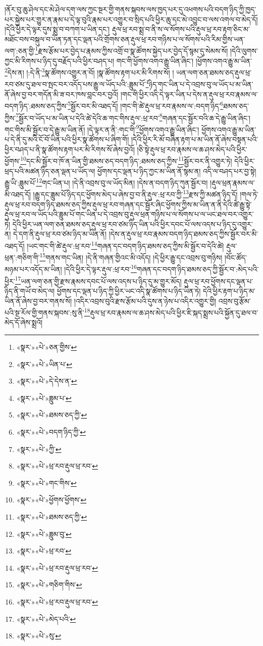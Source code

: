 །ནོར་བུ་ཆུ་ཤེལ་དང་མེ་ཤེལ་དག་ལས་ཀྱང་སྔར་གྱི་གནས་སྐབས་ལས་ཁྱད་པར་དུ་འཕགས་པའི་བདག་ཉིད་ཀྱི་ཁྱད་པར་སྐྱེས་པར་གྱུར་ན་རྣམ་པ་དེ་ལྟ་བུའི་རྣམ་པར་འགྱུར་བ་སྲིད་པའི་ཕྱིར་ཆུ་དང་མེ་འབྱུང་བ་ལས་འགལ་བ་མེད་དོ། །དེའི་ཕྱིར་དེ་ལྟར་དུས་སྨྲ་བ་བཀག་པ་ཡིན་དང་། རྡུལ་ཕྲ་རབ་སྨྲ་བ་ནི་ས་ལ་སོགས་པའི་རྡུལ་ཕྲ་རབ་རྟག་ཅིང་མ་མཐོང་བས་བསྐུལ་བ་ཡོན་ཏན་དང་ལྡན་པའི་གྲོགས་ཅན་རྡུལ་ཕྲ་རབ་གཉིས་པ་ལ་སོགས་པའི་རིམ་གྱིས་ཡན་ལག་:ཅན་གྱི་\footnote{«སྣར་»«པེ་»ཅན་གྱིས་}རྫས་རྩོམ་པར་བྱེད་པ་རྣམས་ཀྱིས་འགྲོ་བ་སྣ་ཚོགས་སྐྱེད་པར་བྱེད་དོ་སྙམ་དུ་སེམས་སོ། །དེའི་ལུགས་ཀྱང་མི་རིགས་པ་ཉིད་དུ་བརྗོད་པའི་ཕྱིར་བཤད་པ། གང་གི་ཕྱོགས་འགའ་རྒྱུ་ཡིན་ཞིང་། །ཕྱོགས་འགའ་རྒྱུ་མ་ཡིན་\footnote{«སྣར་»«པེ་»ཡིན་པ་}དེས་ན། །:དེ་ནི་\footnote{«སྣར་»«པེ་»དེ་དེས་ན་}སྣ་ཚོགས་འགྱུར་ན་བོ། །སྣ་ཚོགས་རྟག་པར་མི་རིགས་སོ། །
ཡན་ལག་ཅན་ཐམས་ཅད་རྡུལ་ཕྲ་རབ་ཙམ་དུ་ཐལ་བ་སྤང་བར་འདོད་པས་རྒྱུ་ལ་ཡོད་པའི་:ཟླུམ་པོ་\footnote{«སྣར་»«པེ་»ཟླུམ་པ་}ཉིད་གང་ཡིན་པ་དེ་འབྲས་བུ་ལ་ཡོད་པ་མ་ཡིན་ནོ་ཞེས་བྱ་བར་གདོན་མི་ཟ་བར་ཁས་བླང་བར་བྱའོ། །གང་གི་ཕྱིར་འདི་དེ་ལྟར་ཡིན་པ་དེས་ན་རྡུལ་ཕྲ་རབ་རྣམས་ལ་བདག་ཉིད་:ཐམས་ཅད་ཀྱིས་\footnote{«སྣར་»«པེ་»ཐམས་ཅད་ཀྱི་}སྦྱོར་བར་མི་འཐད་དོ། །གང་གི་ཚེ་རྡུལ་ཕྲ་རབ་རྣམས་ལ་:བདག་ཉིད་\footnote{«སྣར་»«པེ་»བདག་ཉིད་ཀྱི་}ཐམས་ཅད་ཀྱིས་\footnote{«སྣར་»«པེ་»ཀྱི་}སྦྱོར་བ་ཡོད་པ་མ་ཡིན་པ་དེའི་ཚེ་དེའི་ཆ་གང་གིས་རྡུལ་:ཕྲ་རབ་\footnote{«སྣར་»«པེ་»ཕྲ་རབ་རྡུལ་ཕྲ་རབ་}གཞན་དང་སྦྱོར་བའི་ཆ་དེ་རྒྱུ་ཡིན་ཞིང་། གང་གིས་མི་སྦྱོར་བ་དེ་རྒྱུ་མ་ཡིན་ནོ། །དེ་ལྟར་ན་ནི་:གང་གི་\footnote{«སྣར་»«པེ་»གང་གིས་}ཕྱོགས་འགའ་རྒྱུ་ཡིན་ཞིང་། ཕྱོགས་འགའ་རྒྱུ་མ་ཡིན་པ་དེ་ནི་དུ་མའི་ངོ་བོ་ཡིན་པའི་ཕྱིར་སྣ་ཚོགས་པ་ཞིག་གོ། །དེའི་ཕྱིར་རི་མོ་བཞིན་རྟག་པ་མ་ཡིན་ནོ་ཞེས་བསྟན་པའི་ཕྱིར་བཤད་པ་ནི་སྣ་ཚོགས་རྟག་པར་མི་རིགས་སོ་ཞེས་བྱའོ། །ཅི་སྟེ་རྡུལ་ཕྲ་རབ་རྣམས་ལ་ཆ་ཤས་མེད་པའི་ཕྱིར་ཕྱོགས་\footnote{«སྣར་»«པེ་»ཕྱོགས་ཕྱོགས་}དང་མི་སྦྱོར་བ་ཁོ་ན་ཡིན་གྱི་ཐམས་ཅད་བདག་ཉིད་:ཐམས་ཅད་ཀྱིས་\footnote{«སྣར་»«པེ་»ཐམས་ཅད་ཀྱི་}སྦྱོར་བར་ནི་འགྱུར་ཏེ། དེའི་ཕྱིར་ཕྲད་པའི་མཚན་ཉིད་ཅན་ལྡན་པ་ཡོད་ལ། ཕྱོགས་དང་ལྡན་པ་ཉིད་ཀྱང་མ་ཡིན་ནོ་སྙམ་ན། འདི་ལ་བཤད་པར་བྱ་སྟེ། རྒྱུ་ཡི་:ཟླུམ་པོ་\footnote{«སྣར་»«པེ་»ཟླུམ་བུ་}གང་ཡིན་པ། །དེ་ནི་འབྲས་བུ་ལ་ཡོད་མིན། །དེས་ན་བདག་ཉིད་ཀུན་སྦྱོར་བ། །རྡུལ་ཕྲན་རྣམས་ལ་མི་འཐད་དོ། །རྒྱུ་དང་ཟླུམ་པོ་ཉིད་དང་ཕྱོགས་མེད་པ་ཞེས་བྱ་བ་ནི་རྡུལ་:ཕྲ་རབ་ཀྱི་\footnote{«སྣར་»«པེ་»ཕྲ་རབ་}རྫས་ཀྱི་མཚན་ཉིད་དོ། །གལ་ཏེ་རྡུལ་ཕྲ་རབ་བདག་ཉིད་ཐམས་ཅད་ཀྱིས་རྡུལ་ཕྲ་རབ་གཞན་དང་སྦྱོར་ཞིང་ཕྱོགས་ཀྱིས་མ་ཡིན་ན་ནི་དེའི་ཚེ་རྒྱུ་སྟེ་རྡུལ་ཕྲ་རབ་ལ་ཡོད་པའི་ཟླུམ་པོ་གང་ཡིན་པ་དེ་འབྲས་བུ་རྡུལ་ཕྲན་གཉིས་པ་ལ་སོགས་པ་ལ་ཡང་ཐལ་བར་འགྱུར་ཏེ། དེའི་ཕྱིར་ཡན་ལག་ཅན་ཐམས་ཅད་རྡུལ་ཕྲ་རབ་ཙམ་ཉིད་ཡིན་པའི་ཕྱིར་དབང་པོ་ལས་འདས་པ་ཉིད་དུ་འགྱུར་ན། དེ་དག་ནི་རྡུལ་ཕྲ་རབ་ཙམ་ཉིད་མ་ཡིན་ནོ། །དེས་ན་རྡུལ་ཕྲ་རབ་རྣམས་བདག་ཉིད་ཐམས་ཅད་ཀྱིས་སྦྱོར་བར་མི་འཐད་དོ། །ཡང་གང་གི་ཚེ་རྡུལ་:ཕྲ་རབ་\footnote{«སྣར་»«པེ་»ཕྲ་རབ་རྡུལ་ཕྲ་རབ་}གཞན་དང་བདག་ཉིད་ཐམས་ཅད་ཀྱིས་མི་སྦྱོར་བ་དེའི་ཚེ། རྡུལ་ཕྲན་:གཅིག་གི་\footnote{«སྣར་»«པེ་»གཅིག་གིས་}གནས་གང་ཡིན། །དེ་ནི་གཞན་གྱིའང་མི་འདོད། །དེ་ཕྱིར་རྒྱུ་དང་འབྲས་བུ་གཉིས། །བོང་ཚོད་མཉམ་པར་འདོད་མ་ཡིན། །དེའི་ཕྱིར་དེ་ལྟར་རྡུལ་:ཕྲ་རབ་\footnote{«སྣར་»«པེ་»ཕྲ་རབ་རྡུལ་ཕྲ་རབ་}གཞན་དང་བདག་ཉིད་ཐམས་ཅད་ཀྱི་སྦྱོར་བ་:མེད་པའི་ཕྱིར་\footnote{«སྣར་»«པེ་»མེད་པའི་}ཡན་ལག་ཅན་གྱི་རྫས་རྣམས་དབང་པོ་ལས་འདས་པ་ཉིད་དུ་མ་གྱུར་མོད། རྡུལ་ཕྲ་རབ་ཕྱོགས་དང་ལྡན་པ་ཉིད་ནི་གཡོ་བ་མེད་ལ། ཕྱོགས་དང་ལྡན་པ་ཉིད་ཀྱི་ཕྱིར་ཡང་འདི་སྣ་ཚོགས་པ་ཉིད་ཡིན་ཏེ། དེའི་ཕྱིར་རྟག་པ་ཉིད་མ་ཡིན་ནོ་ཞེས་བྱ་བར་གནས་སོ། །འདིར་འབྲས་བུའི་རྫས་རྩོམ་པའི་དུས་ན་ཉེས་པ་འདིར་འགྱུར་གྱི། འབྲས་བུ་རྩོམ་པའི་སྔ་རོལ་གྱི་གནས་སྐབས་:སུ་ནི་\footnote{«སྣར་»«པེ་»སུ་}རྡུལ་ཕྲ་རབ་རྣམས་ལ་ཆ་ཤས་མེད་པའི་ཕྱིར་ཇི་སྐད་སྨྲས་པའི་སྐྱོན་དུ་ཐལ་བ་མེད་དོ་ཞེས་སྨྲའོ། 